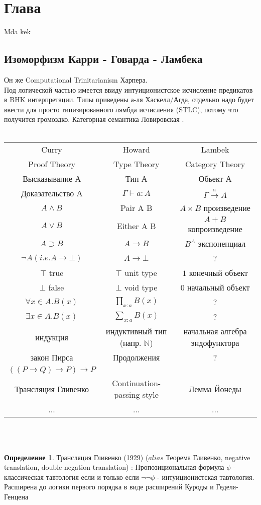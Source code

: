 \documentclass[10pt,a4paper]{article}
\theoremstyle{definition}
\newtheorem{Def}{Определение}
\begin{document}
\section{Глава}
Mda kek \\
\subsection{Изоморфизм Карри - Говарда - Ламбека}

Он же Computational Trinitarianism Харпера.\\
Под логической частью имеется ввиду интуиционистское исчисление предикатов в BHK интерпретации. Типы приведены а-ля Хаскелл/Агда, отдельно надо будет ввести для просто типизированного лямбда исчисления (STLC), потому что получится громоздко. Категорная семантика Ловировская \cite{adjointnessLawvere}.\\ \\
\begin{tabular}{ | c | c | c | }
  \hline
  Curry & Howard & Lambek \\
  Proof Theory & Type Theory & Category Theory \\ \hline
  Высказывание А & Тип А & Обьект А \\
  Доказательство А & $\Gamma \vdash a : A$ & $ \Gamma \xrightarrow{\text{a}} A$ \\
  $ A \wedge B $ & Pair A B & $A \times B $ произведение \\
  $ A \vee B$ & Either A B & $A + B $ копроизведение \\
  $ A \supset B $ & $ A \rightarrow B $ & $B^A $ экспоненциал \\
  $\neg A (i. e. A \rightarrow \bot)$ & $ A \rightarrow \bot$ & ?  \\
  $\top$ true & $ \top $ unit type  & $1$ конечный объект \\
  $\bot$ false & $ \bot$ void type  & $0$ начальный объект \\
  \hline
  $\forall x \in A . B(x)$ & $\prod_{x:a}^{} B(x)$ & ? \\
  $\exists x \in A . B(x)$ & $\sum_{x:a}^{} B(x)$ & ? \\
  \hline
  индукция & индуктивный тип (напр. $\mathbb{N}$) & начальная алгебра эндофунктора \\
  \hline
  закон Пирса  & Продолжения  & ? \\
  $ ((P \rightarrow Q) \rightarrow P) \rightarrow P$ & & \\
  \hline
  Трансляция Гливенко & Continuation-passing style & Лемма Йонеды \\
  \hline
  ... & ... & ... \\
  \hline
\end{tabular}
\\
\\
\begin{Def}
Трансляция Гливенко (1929) ($alias$ Теорема Гливенко, negative translation, double-negation translation) :  Пропозициональная формула $\phi$ - классическая тавтология если и только если $\neg \neg \phi$ - интуиционистская тавтология. Расширена до логики первого порядка в виде расширений Куроды и Геделя-Генцена\\
\end{Def}
\end{document}
